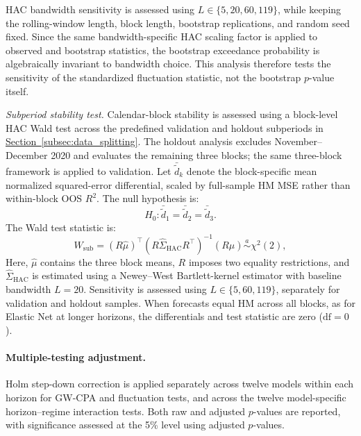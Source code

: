 \documentclass[runningheads,orivec]{llncs}
\begin{document}
HAC bandwidth sensitivity is assessed using $L\in\{5,20,60,119\}$, while keeping the rolling-window length, block length, bootstrap replications, and random seed fixed. Since the same bandwidth-specific HAC scaling factor is applied to observed and bootstrap statistics, the bootstrap exceedance probability is algebraically invariant to bandwidth choice. This analysis therefore tests the sensitivity of the standardized fluctuation statistic, not the bootstrap $p$-value itself.

\textit{Subperiod stability test.} Calendar-block stability is assessed using a block-level HAC Wald test across the predefined validation and holdout subperiods in \hyperref[subsec:data_splitting]{Section~\ref*{subsec:data_splitting}}. The holdout analysis excludes November--December 2020 and evaluates the remaining three blocks; the same three-block framework is applied to validation. Let $\bar{\widetilde d}_k$ denote the block-specific mean normalized squared-error differential, scaled by full-sample HM MSE rather than within-block OOS $R^2$. The null hypothesis is:
\begin{equation}
H_0:
\bar{\widetilde d}_1
=
\bar{\widetilde d}_2
=
\bar{\widetilde d}_3.
\end{equation}
The Wald test statistic is:
\begin{equation}
W_{\mathrm{sub}}
=
(R\widehat\mu)^\top
(R\widehat\Sigma_{\mathrm{HAC}}R^\top)^{-1}
(R\widehat\mu)
\overset{a}{\sim}\chi^2(2),
\end{equation}
Here, $\widehat\mu$ contains the three block means, $R$ imposes two equality restrictions, and $\widehat\Sigma_{\mathrm{HAC}}$ is estimated using a Newey--West Bartlett-kernel estimator with baseline bandwidth $L=20$. Sensitivity is assessed using $L\in\{5,60,119\}$, separately for validation and holdout samples. When forecasts equal HM across all blocks, as for Elastic Net at longer horizons, the differentials and test statistic are zero ($\mathrm{df}=0$).

\paragraph{Multiple-testing adjustment.} Holm step-down correction is applied separately across twelve models within each horizon for GW-CPA and fluctuation tests, and across the twelve model-specific horizon--regime interaction tests. Both raw and adjusted $p$-values are reported, with significance assessed at the 5\% level using adjusted $p$-values.
\end{document}
